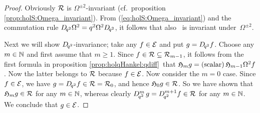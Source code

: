 \begin{proof}
Obviously $\mathcal R$ is $\Omega^{\pm 2}$-invariant
(cf.\ proposition \ref{prop:holS:Omega_invariant}).
From (\ref{eq:holS:Omega_invariant}) and the commutation rule
$D_{\!q^2} \Omega^2 = q^2 \Omega^2 D_{\!q^2}$, it follows that also \Hcore\ is
invariant \mbox{under $\Omega^{\pm 2}$}\@.

Next we will show $D_{\!q^2}$-invariance; take any $f\in\mathcal E$ and put $g=D_{\!q^2} f$.
Choose any $m\in \mathbb{N}$ and first assume that $m\geq 1$.
Since $f\in \mathcal R \subseteq {\mathcal R}_{m-1}$, it follows
from the first formula in proposition \ref{prop:holqHankel:qdiff}\ that
$\mathfrak{H}_{m}g = ({\rm scalar})\, \mathfrak{H}_{m-1} \Omega^2 f$.
Now the latter belongs to $\mathcal R$ because $f\in\mathcal E$.
Now consider the $m=0$ case. Since $f\in\mathcal E$, we have
$g = D_{\!q^2} f \in \mathcal R = {\mathcal R}_{0}$, and hence
$\mathfrak{H}_{0} g \in \mathcal R$.
So we have shown that $\mathfrak{H}_{m}g \in \mathcal R$ for any $m\in\mathbb{N}$,
whereas clearly $D_{\!q^2}^m \, g = D_{\!q^2}^{m+1} f \in \mathcal R$
for any $m\in\mathbb{N}$. We conclude that $g\in\mathcal E$.


\end{proof}
